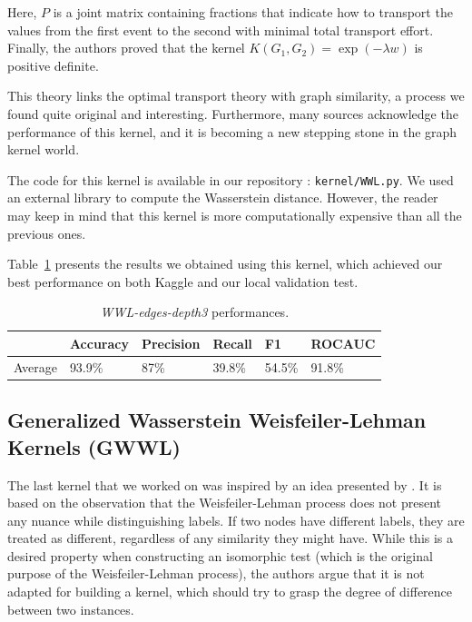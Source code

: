 \documentclass{IEEEtran}
\begin{document}
Here, $P$ is a joint matrix containing fractions that indicate how to transport the values from the first event to the second with minimal total transport effort.
Finally, the authors proved that the kernel $K(G_1,G_2) = \exp(-\lambda w)$ is positive definite.

This theory links the optimal transport theory with graph similarity, a process we found quite original and interesting. Furthermore, many sources acknowledge the performance of this kernel, and it is becoming a new stepping stone in the graph kernel world.

The code for this kernel is available in our repository : \texttt{kernel/WWL.py}.
We used an external library to compute the Wasserstein distance.
However, the reader may keep in mind that this kernel is more
computationally expensive than all the previous ones.

Table~\ref{tab:wwl} presents the results we obtained using this kernel, which achieved our best performance on both Kaggle and our local validation test.

\begin{table}[h]
    \centering
    \begin{tabular}{l|llll|l}
                & Accuracy & Precision & Recall & F1     & ROCAUC \\
        \hline
        Average & 93.9\%   & 87\%      & 39.8\% & 54.5\% & 91.8\% \\
    \end{tabular}
    \caption{\emph{WWL-edges-depth3} performances.}
    \label{tab:wwl}
\end{table}

\subsection{Generalized Wasserstein Weisfeiler-Lehman Kernels (GWWL)}

The last kernel that we worked on was inspired by an idea presented by \cite{schulz2022generalized}. It is based on the observation that the Weisfeiler-Lehman process does not present any nuance while distinguishing labels. If two nodes have different labels, they are treated as different, regardless of any similarity they might have. While this is a desired property when constructing an isomorphic test (which is the original purpose of the Weisfeiler-Lehman process), the authors argue that it is not adapted for building a kernel, which should try to grasp the degree of difference between two instances.
\end{document}
